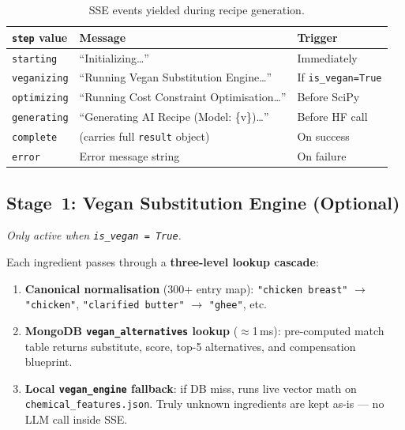 \documentclass[12pt, a4paper]{article}
\begin{document}
\begin{table}[H]
\centering
\caption{SSE events yielded during recipe generation.}
\label{tab:sse}
\begin{tabular}{l l l}
\toprule
\textbf{\texttt{step} value} & \textbf{Message} & \textbf{Trigger} \\
\midrule
\texttt{starting}   & ``Initializing\ldots''                       & Immediately \\
\texttt{veganizing} & ``Running Vegan Substitution Engine\ldots''  & If \texttt{is\_vegan=True} \\
\texttt{optimizing} & ``Running Cost Constraint Optimisation\ldots''& Before SciPy \\
\texttt{generating} & ``Generating AI Recipe (Model: \{v\})\ldots''& Before HF call \\
\texttt{complete}   & (carries full \texttt{result} object)         & On success \\
\texttt{error}      & Error message string                          & On failure \\
\bottomrule
\end{tabular}
\end{table}

\subsection{Stage~1: Vegan Substitution Engine (Optional)}

\textit{Only active when \texttt{is\_vegan = True}.}

Each ingredient passes through a \textbf{three-level lookup cascade}:

\begin{enumerate}
  \item \textbf{Canonical normalisation} (300+ entry map): \texttt{"chicken breast"} $\rightarrow$ \texttt{"chicken"}, \texttt{"clarified butter"} $\rightarrow$ \texttt{"ghee"}, etc.
  \item \textbf{MongoDB \texttt{vegan\_alternatives} lookup} ($\approx$1\,ms): pre-computed match table returns substitute, score, top-5 alternatives, and compensation blueprint.
  \item \textbf{Local \texttt{vegan\_engine} fallback}: if DB miss, runs live vector math on \texttt{chemical\_\allowbreak features.json}.  Truly unknown ingredients are kept as-is --- no LLM call inside SSE.
\end{enumerate}
\end{document}
